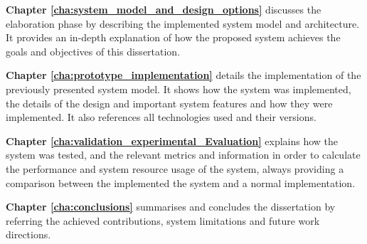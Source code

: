 \textbf{Chapter \ref{cha:system_model_and_design_options}} discusses the elaboration phase by describing the implemented system model and architecture. It provides an in-depth explanation of how the proposed system achieves the goals and objectives of this dissertation.

\textbf{Chapter \ref{cha:prototype_implementation}} details the implementation of the previously presented system model. It shows how the system was implemented, the details of the design and important system features and how they were implemented. It also references all technologies used and their versions.

\textbf{Chapter \ref{cha:validation_experimental_Evaluation}} explains how the system was tested, and the relevant metrics and information in order to calculate the performance and system resource usage of the system, always providing a comparison between the implemented the system and a normal implementation.

\textbf{Chapter \ref{cha:conclusions}} summarises and concludes the dissertation by referring the achieved contributions, system limitations and future work directions.